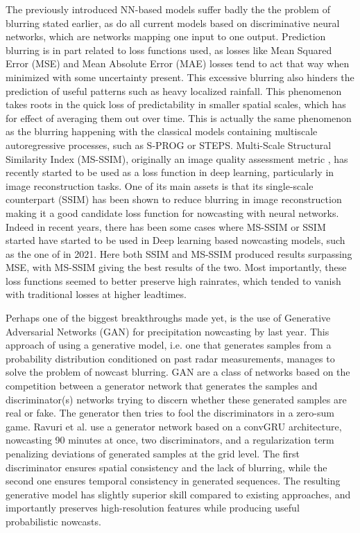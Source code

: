 The previously introduced NN-based models suffer badly the the problem of blurring stated earlier, as do all current models based on discriminative neural networks, which are networks mapping one input to one output. Prediction blurring is in part related to loss functions used, as losses like Mean Squared Error (MSE) and Mean Absolute Error (MAE) losses tend to act that way when minimized with some uncertainty present. This excessive blurring also hinders the prediction of useful patterns such as heavy localized rainfall. This phenomenon takes roots in the quick loss of predictability in smaller spatial scales, which has for effect of averaging them out over time. This is actually the same phenomenon as the blurring happening with the classical models containing multiscale autoregressive processes, such as S-PROG or STEPS. 
Multi-Scale Structural Similarity Index (MS-SSIM), originally an image quality assessment metric \cite{wang_multiscale_2003}, has recently started to be used as a loss function in deep learning, particularly in image reconstruction tasks. One of its main assets is that its single-scale counterpart (SSIM) has been shown to reduce blurring in image reconstruction \cite{zhao_loss_2017} making it a good candidate loss function for nowcasting with neural networks.  Indeed in recent years, there has been some cases where MS-SSIM or SSIM started have started to be used in Deep learning based nowcasting models, such as the one of \citet{yin_application_2021} in 2021. Here both SSIM and MS-SSIM produced results surpassing MSE, with MS-SSIM giving the best results of the two. Most importantly, these loss functions seemed to better preserve high rainrates, which tended to vanish with traditional losses at higher leadtimes. 

Perhaps one of the biggest breakthroughs made yet, is the use of Generative Adversarial Networks (GAN) for precipitation nowcasting by \citet{ravuri_skilful_2021} last year. This approach of using a generative model, i.e. one that generates samples from a probability distribution conditioned on past radar measurements, manages to solve the problem of nowcast blurring. GAN are a class of networks based on the competition between a generator network that generates the samples and discriminator(s) networks trying to discern whether these generated samples are real or fake. The generator then tries to fool the discriminators in a zero-sum game. Ravuri et al. use a generator network based on a convGRU architecture, nowcasting 90 minutes at once, two discriminators, and a regularization term penalizing deviations of generated samples at the grid level. The first discriminator ensures spatial consistency and the lack of blurring, while the second one ensures temporal consistency in generated sequences. The resulting generative model has slightly superior skill compared to existing approaches, and importantly preserves high-resolution features while producing useful probabilistic nowcasts. \cite{ravuri_skilful_2021}

